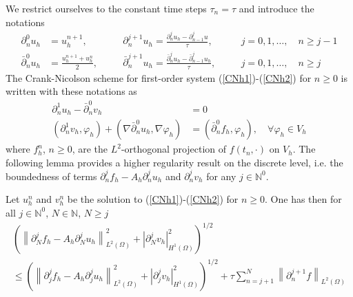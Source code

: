 \documentclass{imanum}
\begin{document}
We restrict ourselves to the constant time steps $\tau_n=\tau$ and introduce the notations
  \begin{align*}
    {\partial}^{0}_{n} u_h&=u_h^{n+1},&&\quad
    {\partial}^{j+1}_{n} u_h={\frac{{\partial}^{j}_{n}u_h-{\partial}^{j}_{n-1}u}{{\tau}}},
    &&\quad
    j=0,1,{\ldots},\quad n\ge j-1\\
    \bar{\partial}^0_n {u}_h&=\frac{u_h^{n + 1} + u_h^n}{2},&&\quad\bar{\partial}^{j + 1}_n  {u}_h= \frac{\bar{\partial}^j_n
       {u}_h - \bar{\partial}^j_{n - 1} {u}_h}{\tau},     
    &&\quad
    j=0,1,{\ldots},\quad n\ge j
  \end{align*}
The Crank-Nicolson scheme for first-order system (\ref{CNh1})-(\ref{CNh2}) for $n\ge 0$ is written with these notations as  
\begin{align}
   \label{CNh1N}
   {\partial}^{1}_{n} u_h - \bar{\partial}^0_n {v}_h &= 0\\
   \label{CNh2N}
   \left( {\partial}^{1}_{n} v_h, \varphi_h \right) + \left( \nabla \bar{\partial}^0_n {u}_h, \nabla \varphi_h \right) &= \left(  \bar{\partial}^0_n {f}_h, \varphi_h \right), \hspace{1em} \forall \varphi_h \in V_h
\end{align}
where $f^n_h$, $n\ge 0$, are the $L^2$-orthogonal projection of $f(t_n,\cdot)$ on $V_h$. The following lemma provides a higher regularity result on the discrete level, i.e. the boundedness of terms $\partial_n^j f_h - A_h \partial_n^j u_h$ and $\partial^j_n v_h$ for any $j\in\mathbb{N}^0$.

\begin{lemma}\label{bound_d4u_abst} Let $u_h^n$ and $v_h^n$ be the solution to (\ref{CNh1})-(\ref{CNh2}) for $n\ge 0$. One has then for all $j\in\mathbb{N}^0$, $N\in\mathbb{N}$, $N\ge j$
\begin{multline}\label{boundj}
 \left( \left\| \partial^{j}_N f_h-A_h\partial^{j}_N u_h \right\|_{L^2(\Omega)}^2 + \left| {\partial}^j_N v_h \right|_{H^1(\Omega)}^2\right)^{{1}/{2}} \\
 \leq \left( \left\| \partial^{j}_jf_h-A_h\partial^{j}_j u_h \right\|_{L^2(\Omega)}^2 + \left|{\partial}^j_j v_h \right|_{H^1(\Omega)}^2\right)^{{1}/{2}} + \tau\sum_{n = j+1}^N\left\| {\partial}^{j+1}_n {f}\right\|_{L^2(\Omega)}
\end{multline}
\end{lemma}
\end{document}
